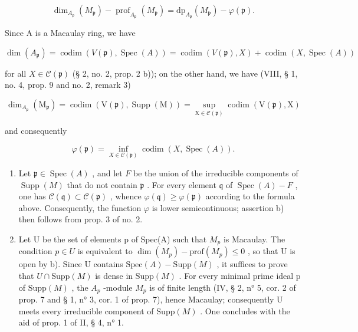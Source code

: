 \[
\dim_ {A _ {\mathfrak {p}}} (M _ {\mathfrak {p}}) - \operatorname{prof} _ {A _ {\mathfrak {p}}} (M _ {\mathfrak {p}}) = \mathrm{dp} _ {A _ {\mathfrak {p}}} (M _ {\mathfrak {p}}) - \varphi (\mathfrak {p}).
\]

Since A is a Macaulay ring, we have

\[
\dim (A _ {\mathfrak {p}}) = \operatorname{codim} (V (\mathfrak {p}), \operatorname{Spec} (A)) = \operatorname{codim} (V (\mathfrak {p}), X) + \operatorname{codim} (X, \operatorname{Spec} (A))
\]

for all \(X \in \mathcal{C}(\mathfrak{p})\) (§ 2, no. 2, prop. 2 b)); on the other hand, we have (VIII, § 1, no. 4, prop. 9 and no. 2, remark 3)

\[
\dim_ {A_ {\mathfrak {p}}} \left(\mathrm{M} _ {\mathfrak {p}}\right) = \operatorname{codim} (\mathrm{V} (\mathfrak {p}), \operatorname{Supp} (\mathrm{M})) = \sup _ {\mathrm{X} \in \mathscr {C} (\mathfrak {p})} \operatorname{codim} (\mathrm{V} (\mathfrak {p}), \mathrm{X})
\]

and consequently

\[
\varphi (\mathfrak {p}) = \inf _ {X \in \mathscr {C} (\mathfrak {p})} \operatorname{codim} (X, \operatorname{Spec} (A)).
\]

\begin{enumerate}
\def\labelenumi{\alph{enumi})}
\setcounter{enumi}{1}
\item
  Let \(\mathfrak{p} \in \operatorname{Spec}(A)\) , and let \(F\) be the union of the irreducible components of \(\operatorname{Supp}(M)\) that do not contain \(\mathfrak{p}\) . For every element \(\mathfrak{q}\) of \(\operatorname{Spec}(A) - F\) , one has \(\mathcal{C}(\mathfrak{q}) \subset \mathcal{C}(\mathfrak{p})\) , whence \(\varphi(\mathfrak{q}) \geqslant \varphi(\mathfrak{p})\) according to the formula above. Consequently, the function \(\varphi\) is lower semicontinuous; assertion b) then follows from prop. 3 of no. 2.
\item
  Let U be the set of elements p of Spec(A) such that \(M_{p}\) is Macaulay. The condition \(p \in U\) is equivalent to \(\dim(M_{p}) - \text{prof}(M_{p}) \leqslant 0\) , so that U is open by b). Since U contains \(\text{Spec}(A) - \text{Supp}(M)\) , it suffices to prove that \(U \cap \text{Supp}(M)\) is dense in \(\text{Supp}(M)\) . For every minimal prime ideal p of \(\text{Supp}(M)\) , the \(A_{p}\) -module \(M_{p}\) is of finite length (IV, § 2, n° 5, cor. 2 of prop. 7 and § 1, n° 3, cor. 1 of prop. 7), hence Macaulay; consequently U meets every irreducible component of \(\text{Supp}(M)\) . One concludes with the aid of prop. 1 of II, § 4, n° 1.
\end{enumerate}

